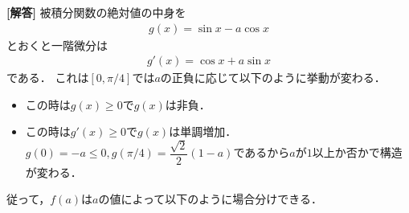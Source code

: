 \documentclass[../../main.tex]{subfiles}
\begin{document}
\begin{oframed}
  
\end{oframed}

{\bf [解答]}
被積分関数の絶対値の中身を
\begin{align}
  g(x) = \sin x-a\cos x \label{eq:1}
\end{align}
とおくと一階微分は
\begin{align}
  g'(x) = \cos x + a \sin x \label{eq:2}
\end{align}
である．
これは$[0,\pi/4]$では$a$の正負に応じて以下のように挙動が変わる．

\begin{itemize}
  \item[$a\le 0$の時] この時は$g(x) \ge 0$で$g(x)$は非負．
  \item[$0\le a$の時] この時は$g'(x) \ge 0$で$g(x)$は単調増加．$g(0)=-a \le 0, g(\pi/4)=\dfrac{\sqrt{2}}{2}(1-a)$であるから$a$が$1$以上か否かで構造が変わる．
\end{itemize}

従って，$f(a)$は$a$の値によって以下のように場合分けできる．
\end{document}
